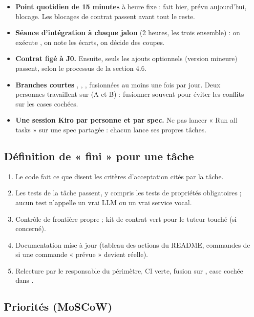 \begin{itemize}[leftmargin=1.2em]
  \item \textbf{Point quotidien de 15 minutes} à heure fixe : fait hier, prévu aujourd'hui, blocage. Les blocages de contrat passent avant tout le reste.
  \item \textbf{Séance d'intégration à chaque jalon} (2 heures, les trois ensemble) : on exécute , on note les écarts, on décide des coupes.
  \item \textbf{Contrat figé à J0.} Ensuite, seuls les ajouts optionnels (version mineure) passent, selon le processus de la section 4.6.
  \item \textbf{Branches courtes} , , , fusionnées au moins une fois par jour. Deux personnes travaillent sur  (A et B) : fusionner souvent pour éviter les conflits sur les cases cochées.
  \item \textbf{Une session Kiro par personne et par spec.} Ne pas lancer « Run all tasks » sur une spec partagée : chacun lance ses propres tâches.
\end{itemize}

\subsection{Définition de « fini » pour une tâche}

\begin{enumerate}[leftmargin=1.2em]
  \item Le code fait ce que disent les critères d'acceptation cités par la tâche.
  \item Les tests de la tâche passent, y compris les tests de propriétés obligatoires ; aucun test n'appelle un vrai LLM ou un vrai service vocal.
  \item Contrôle de frontière propre ; kit de contrat vert pour le tuteur touché (si concerné).
  \item Documentation mise à jour (tableau des actions du README, commandes de  si une commande « prévue » devient réelle).
  \item Relecture par le responsable du périmètre, CI verte, fusion sur , case cochée dans .
\end{enumerate}

\subsection{Priorités (MoSCoW)}

